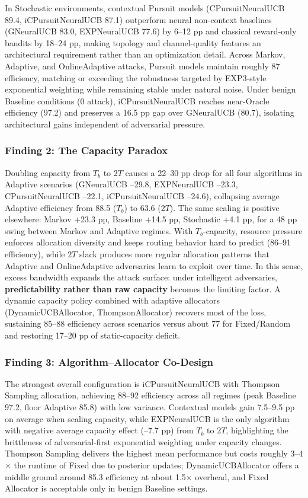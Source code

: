 \documentclass[10pt,twocolumn,journal]{IEEEtran}
\begin{document}
In Stochastic environments, contextual Pursuit models (CPursuitNeuralUCB 89.4, iCPursuitNeuralUCB 87.1) outperform neural non-context baselines (GNeuralUCB 83.0, EXPNeuralUCB 77.6) by 6--12 pp and classical reward-only bandits by 18--24 pp, making topology and channel-quality features an architectural requirement rather than an optimization detail. Across Markov, Adaptive, and OnlineAdaptive attacks, Pursuit models maintain roughly 87 efficiency, matching or exceeding the robustness targeted by EXP3-style exponential weighting while remaining stable under natural noise. Under benign Baseline conditions (0 attack), iCPursuitNeuralUCB reaches near-Oracle efficiency (97.2) and preserves a 16.5 pp gap over GNeuralUCB (80.7), isolating architectural gains independent of adversarial pressure.

\subsubsection{Finding 2: The Capacity Paradox}

Doubling capacity from $T_b$ to $2T$ causes a 22--30 pp drop for all four algorithms in Adaptive scenarios (GNeuralUCB --29.8, EXPNeuralUCB --23.3, CPursuitNeuralUCB --22.1, iCPursuitNeuralUCB --24.6), collapsing average Adaptive efficiency from 88.5 ($T_b$) to 63.6 ($2T$). The same scaling is positive elsewhere: Markov +23.3 pp, Baseline +14.5 pp, Stochastic +4.1 pp, for a 48 pp swing between Markov and Adaptive regimes. With $T_b$-capacity, resource pressure enforces allocation diversity and keeps routing behavior hard to predict (86--91 efficiency), while $2T$ slack produces more regular allocation patterns that Adaptive and OnlineAdaptive adversaries learn to exploit over time. In this sense, excess bandwidth expands the attack surface: under intelligent adversaries, \textbf{predictability rather than raw capacity} becomes the limiting factor. A dynamic capacity policy combined with adaptive allocators (DynamicUCBAllocator, ThompsonAllocator) recovers most of the loss, sustaining 85--88 efficiency across scenarios versus about 77 for Fixed/Random and restoring 17--20 pp of static-capacity deficit.

\subsubsection{Finding 3: Algorithm--Allocator Co-Design}

The strongest overall configuration is iCPursuitNeuralUCB with Thompson Sampling allocation, achieving 88--92 efficiency across all regimes (peak Baseline 97.2, floor Adaptive 85.8) with low variance. Contextual models gain 7.5--9.5 pp on average when scaling capacity, while EXPNeuralUCB is the only algorithm with negative average capacity effect (--7.7 pp) from $T_b$ to $2T$, highlighting the brittleness of adversarial-first exponential weighting under capacity changes. Thompson Sampling delivers the highest mean performance but costs roughly 3--4$\times$ the runtime of Fixed due to posterior updates; DynamicUCBAllocator offers a middle ground around 85.3 efficiency at about 1.5$\times$ overhead, and Fixed Allocator is acceptable only in benign Baseline settings.
\end{document}
